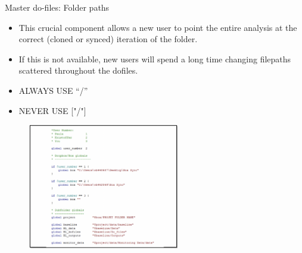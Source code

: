 \documentclass[aspectratio=169]{beamer}
\begin{document}
\begin{frame}[fragile]{Master do-files: Folder paths}
\begin{multicols}{2}	
	
	\begin{itemize}[<default overlay specification>]
		\item<1> This crucial component allows a new user to point the entire analysis at the correct (cloned or synced) iteration of the folder.
		\item<1> If this is not available, new users will spend a long time changing filepaths scattered throughout the dofiles.
		\item<1>  ALWAYS USE “/” 
		\item<1>  NEVER USE ["/"] 
	\end{itemize}
	
	\begin{figure}
		\centering
		\includegraphics[height=55mm]{img/Structure15}
	\end{figure}
	
\end{multicols}
\end{frame}
\end{document}
